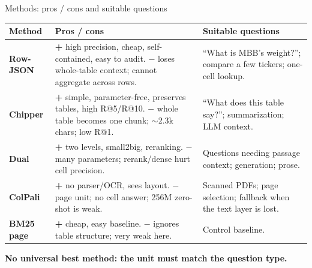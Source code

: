 \documentclass[aspectratio=169,11pt]{beamer}
\begin{document}
\begin{frame}{Methods: pros / cons and suitable questions}
  \begin{center}
  \scriptsize
  \setlength{\tabcolsep}{4pt}
  \renewcommand{\arraystretch}{1.18}
  \begin{tabular}{@{}L{0.15\textwidth}L{0.43\textwidth}L{0.38\textwidth}@{}}
    \toprule
    \textbf{Method} & \textbf{Pros / cons} & \textbf{Suitable questions} \\
    \midrule
    \textbf{Row-JSON} &
      \textbf{+} high precision, cheap, self-contained, easy to audit.\newline
      \textbf{$-$} loses whole-table context; cannot aggregate across rows. &
      ``What is MBB's weight?''; compare a few tickers; one-cell lookup. \\
    \textbf{Chipper} &
      \textbf{+} simple, parameter-free, preserves tables, high R@5/R@10.\newline
      \textbf{$-$} whole table becomes one chunk; $\sim$2.3k chars; low R@1. &
      ``What does this table say?''; summarization; LLM context. \\
    \textbf{Dual} &
      \textbf{+} two levels, small2big, reranking.\newline
      \textbf{$-$} many parameters; rerank/dense hurt cell precision. &
      Questions needing passage context; generation; prose. \\
    \textbf{ColPali} &
      \textbf{+} no parser/OCR, sees layout.\newline
      \textbf{$-$} page unit; no cell answer; 256M zero-shot is weak. &
      Scanned PDFs; page selection; fallback when the text layer is lost. \\
    \textbf{BM25 page} &
      \textbf{+} cheap, easy baseline.\newline
      \textbf{$-$} ignores table structure; very weak here. &
      Control baseline. \\
    \bottomrule
  \end{tabular}
  \end{center}

  \begin{center}\footnotesize
    \textbf{No universal best method: the unit must match the question type.}
  \end{center}
\end{frame}
\end{document}
